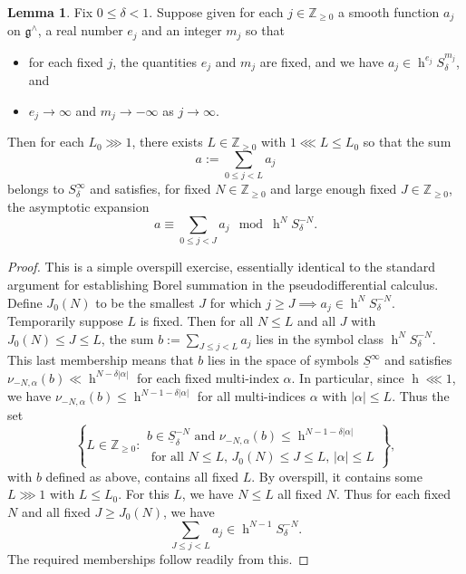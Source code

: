 \documentclass[reqno]{amsart}
\DeclareMathOperator{\h}{h}
\theoremstyle{plain} \newtheorem{theorem} {Theorem}
\theoremstyle{definition} \newtheorem{definition} [theorem] {Definition}
\theoremstyle{itplain} %
\newtheorem{lemma}[theorem]{Lemma}
\numberwithin{equation}{section}
\numberwithin{theorem}{section}
\renewcommand{\geq}{\geqslant}
\renewcommand{\leq}{\leqslant}
\begin{document}
\begin{lemma}\label{lem:borel-summation}
  Fix $0 \leq \delta < 1$.  Suppose given for each $j \in \mathbb{Z}_{\geq 0}$ a smooth function $a_j$ on $\mathfrak{g}^\wedge$, a real number $e_j$ and an integer $m_j$ so that
  \begin{itemize}
  \item for each fixed $j$, the quantities $e_j$ and $m_j$ are fixed, and we have $a_j \in \h^{e_j} S^{m_j}_\delta$, and
  \item $e_j \rightarrow \infty$ and $m_j \rightarrow -\infty$ as $j \rightarrow \infty$.
  \end{itemize}
  Then for each $L_0 \ggg 1$, there exists $L \in \mathbb{Z}_{\geq 0}$ with $1 \lll L  \leq L_0$ so that the sum
  \begin{equation}\label{eq::=-sum-_0}
    a := \sum _{0 \leq j < L} a_j
\end{equation}
belongs to $S^{\infty}_{\delta}$ and satisfies, for fixed $N \in \mathbb{Z}_{\geq 0}$ and large enough fixed $J \in \mathbb{Z}_{\geq 0}$, the asymptotic expansion
  \[
    a \equiv \sum_{0 \leq j < J} a_j \mod{\h^N S^{-N}_\delta}.
  \]
\end{lemma}
\begin{proof}
  This is a simple overspill exercise, essentially identical to the standard argument for establishing Borel summation in the pseudodifferential calculus.  Define $J_0(N)$ to be the smallest $J$ for which $j \geq J \implies a_j \in \h^N S_\delta^{-N}$.  Temporarily suppose $L$ is fixed.  Then for all $N \leq L$ and all $J$ with $J_0(N) \leq J \leq L$, the sum $b := \sum _{J \leq j < L} a_j$ lies in the symbol class $\h^{N} S_\delta^{-N}$.  This last membership means that $b$ lies in the space of symbols $\underline{S}^{\infty}$ and satisfies $\nu_{-N,\alpha}(b) \ll \h^{N - \delta |\alpha|}$ for each fixed multi-index $\alpha$.  In particular, since $\h \lll 1$, we have $\nu_{-N,\alpha}(b) \leq \h^{N - 1 - \delta |\alpha|}$ for all multi-indices $\alpha$ with $|\alpha| \leq L$.  Thus the set
  \begin{equation*}
    \left\{
      L \in \mathbb{Z}_{\geq 0} :
      \begin{gathered}
        b \in \underline{S}_{\delta}^{-N} \text{ and }
      \nu_{-N,\alpha}(b) \leq \h^{N - 1 - \delta |\alpha|} \\
      \text{ for all } N \leq L, \, J_0(N) \leq J \leq L, \,  |\alpha| \leq L
    \end{gathered}
  \right\},
\end{equation*}
with $b$ defined as above, contains all fixed $L$.  By overspill, it contains some $L \ggg 1$ with $L \leq L_0$.  For this $L$, we have $N \leq L$ all fixed $N$.  Thus for each fixed $N$ and all fixed $J \geq J_0(N)$, we have
\begin{equation*}
  \sum _{J \leq j < L } a_j \in \h^{N-1} S_{\delta}^{-N}.
\end{equation*}
The required memberships follow readily from this.\end{proof}
\end{document}
